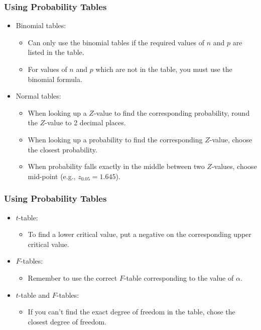 \documentclass[12pt]{beamer}
\begin{document}
\begin{frame}
	\frametitle{Using Probability Tables}
	
	\begin{itemize}[label={\color{blue}$\blacktriangleright$}]
		\item Binomial tables:
		\begin{itemize}[label={\color{blue}$\blacktriangleright$}]
			\item Can only use the binomial tables if the required values of $n$ and $p$ are listed in the table.
			\item For values of $n$ and $p$ which are not in the table, you must use the binomial formula.
		\end{itemize}
		
		\item Normal tables:
		\begin{itemize}[label={\color{blue}$\blacktriangleright$}]
			\item When looking up a $Z$-value to find the corresponding probability, round the $Z$-value to 2 decimal places.
			\item When looking up a probability to find the corresponding $Z$-value, choose the closest probability.
			\item When probability falls exactly in the middle between two $Z$-values, choose mid-point (e.g., $z_{0.05} = 1.645$).
		\end{itemize}
	\end{itemize}
	
\end{frame}
\begin{frame}
	\frametitle{Using Probability Tables}
	
	\begin{itemize}[label={\color{blue}$\blacktriangleright$}]
		\item $t$-table:
		\begin{itemize}[label={\color{blue}$\blacktriangleright$}]
			\item To find a lower critical value, put a negative on the corresponding upper critical value.
		\end{itemize}
		
		\item $F$-tables:
		\begin{itemize}[label={\color{blue}$\blacktriangleright$}]
			\item Remember to use the correct $F$-table corresponding to the value of $\alpha$.
		\end{itemize}
		
		\item $t$-table and $F$-tables:
		\begin{itemize}[label={\color{blue}$\blacktriangleright$}]
			\item If you can't find the exact degree of freedom in the table, chose the closest degree of freedom.
		\end{itemize}
	\end{itemize}
	
\end{frame}
\end{document}
